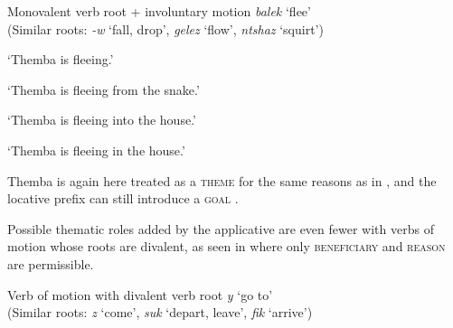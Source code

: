 \documentclass[output=paper]{langsci/langscibook}
\begin{document}
\ea\label{ex:sibanda:6}
\settowidth{}
{Monovalent verb root + involuntary motion \textit{balek} ‘flee’}\\
 (Similar roots: \textit{-w} ‘fall, drop’, \textit{gelez} ‘flow’, \textit{ntshaz} ‘squirt’)\\

\glt ‘Themba is fleeing.’



\glt ‘Themba is fleeing from the snake.’ 


\glt ‘Themba is fleeing into the house.’


\glt ‘Themba is fleeing in the house.’
\z
\z

Themba is again here treated as a \textsc{theme} for the same reasons as in , and the locative prefix can still introduce a \textsc{goal} .

 Possible thematic roles added by the applicative are even fewer with verbs of motion whose roots are divalent, as seen in  where only \textsc{beneficiary} and \textsc{reason} are permissible. 

\ea\label{ex:sibanda:7}
\settowidth{}
{Verb of motion with divalent verb root \textit{y} ‘go to’} \\
 (Similar roots: \textit{z} ‘come’, \textit{suk} ‘depart, leave’, \textit{fik} ‘arrive’)\\
\end{document}
